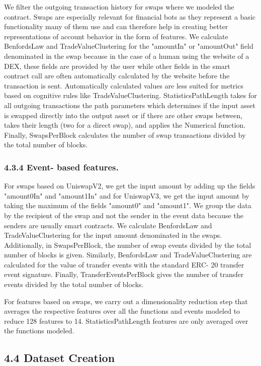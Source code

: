 We filter the outgoing transaction history for swaps where we modeled the contract. Swaps are especially relevant for financial bots as they represent a basic functionality many of them use and can therefore help in creating better representations of account behavior in the form of features. We calculate BenfordsLaw and TradeValueClustering for the "amountIn" or "amountOut" field denominated in the swap because in the case of a human using the website of a DEX, these fields are provided by the user while other fields in the smart contract call are often automatically calculated by the website before the transaction is sent. Automatically calculated values are less suited for metrics based on cognitive rules like TradeValueClustering. StatisticsPathLength takes for all outgoing transactions the path parameters which determines if the input asset is swapped directly into the output asset or if there are other swaps between, takes their length (two for a direct swap), and applies the Numerical function. Finally, SwapsPerBlock calculates the number of swap transactions divided by the total number of blocks.

\subsubsection*{4.3.4 Event- based features.} For swaps based on UniswapV2, we get the input amount by adding up the fields "amount0In" and "amount1In" and for UniswapV3, we get the input amount by taking the maximum of the fields "amount0" and "amount1". We group the data by the recipient of the swap and not the sender in the event data because the senders are usually smart contracts. We calculate BenfordsLaw and TradeValueClustering for the input amount denominated in the swaps. Additionally, in SwapsPerBlock, the number of swap events divided by the total number of blocks is given. Similarly, BenfordsLaw and TradeValueClustering are calculated for the value of transfer events with the standard ERC- 20 transfer event signature. Finally, TransferEventsPerBlock gives the number of transfer events divided by the total number of blocks.

For features based on swaps, we carry out a dimensionality reduction step that averages the respective features over all the functions and events modeled to reduce 128 features to 14. StatisticsPathLength features are only averaged over the functions modeled.

\subsection*{4.4 Dataset Creation}

